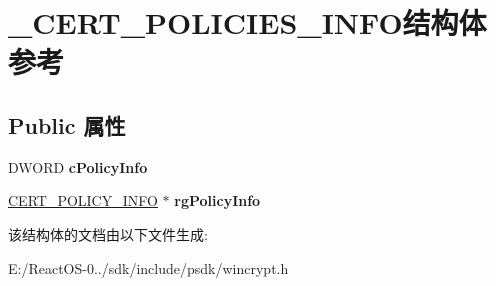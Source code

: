 \hypertarget{struct___c_e_r_t___p_o_l_i_c_i_e_s___i_n_f_o}{}\section{\+\_\+\+C\+E\+R\+T\+\_\+\+P\+O\+L\+I\+C\+I\+E\+S\+\_\+\+I\+N\+F\+O结构体 参考}
\label{struct___c_e_r_t___p_o_l_i_c_i_e_s___i_n_f_o}
\subsection*{Public 属性}
\begin{DoxyCompactItemize}
\item 
\mbox{\label{struct___c_e_r_t___p_o_l_i_c_i_e_s___i_n_f_o_ac8c91bb8ba7b80469a83bdbdf7424c8d}} 
D\+W\+O\+RD {\bfseries c\+Policy\+Info}
\item 
\mbox{\label{struct___c_e_r_t___p_o_l_i_c_i_e_s___i_n_f_o_afc708a06f30ed06a0708d1b8b98e90b3}} 
\hyperlink{struct___c_e_r_t___p_o_l_i_c_y___i_n_f_o}{C\+E\+R\+T\+\_\+\+P\+O\+L\+I\+C\+Y\+\_\+\+I\+N\+FO} $\ast$ {\bfseries rg\+Policy\+Info}
\end{DoxyCompactItemize}


该结构体的文档由以下文件生成\+:\begin{DoxyCompactItemize}
\item 
E\+:/\+React\+O\+S-\/0../sdk/include/psdk/wincrypt.\+h\end{DoxyCompactItemize}
